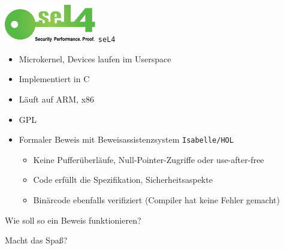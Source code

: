 \documentclass[aspectratio=169]{beamer}
\begin{document}
\begin{frame}
  \begin{center}
    \includegraphics[width=4.0cm]{sel4_logo.pdf}
    \Large{\texttt{seL4}}
  \end{center}
  \begin{itemize}
  \item Microkernel, Devices laufen im Userspace
  \item Implementiert in C
  \item Läuft auf ARM, x86
  \item GPL
  \item Formaler Beweis mit Beweisassistenzsystem \texttt{Isabelle/HOL}
    \begin{itemize}
    \item Keine Pufferüberläufe, Null-Pointer-Zugriffe oder use-after-free
    \item Code erfüllt die Spezifikation, Sicherheitsaspekte
    \item Binärcode ebenfalls verifiziert (Compiler hat keine Fehler gemacht)
    \end{itemize}
  \end{itemize}
\end{frame}
\begin{frame}
  \begin{center}
    \Large{Wie soll so ein Beweis funktionieren?}
  \end{center}
  \pause
  \vfill
  \begin{center}
    \Large{Macht das Spaß?}
  \end{center}  
\end{frame}
\end{document}
